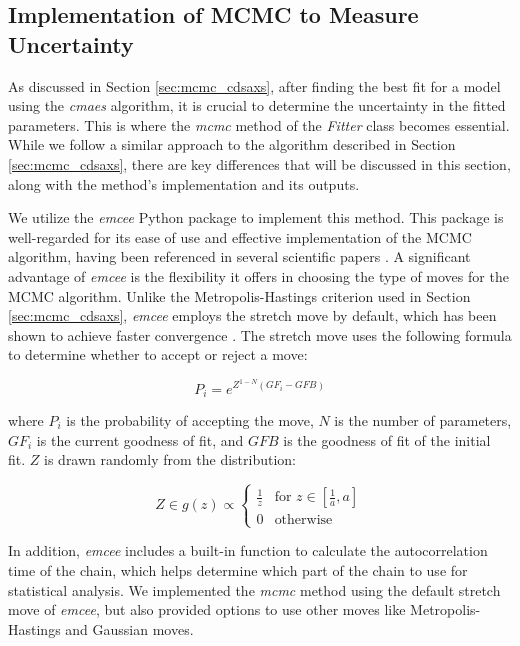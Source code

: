 \subsection{Implementation of MCMC to Measure Uncertainty}

As discussed in Section \ref{sec:mcmc_cdsaxs}, after finding the best fit for a model using the \textit{cmaes} algorithm, it is crucial 
to determine the uncertainty in the fitted parameters. This is where the \textit{mcmc} method of the \textit{Fitter} class becomes essential. 
While we follow a similar approach to the algorithm described in Section \ref{sec:mcmc_cdsaxs}, there are key differences that will be discussed 
in this section, along with the method's implementation and its outputs.

\medskip

We utilize the \textit{emcee} Python package \cite{emcee} to implement this method. This package is well-regarded for its ease 
of use and effective implementation of the MCMC algorithm, having been referenced in several scientific papers \cite{emcee_refed}. 
A significant advantage of \textit{emcee} is the flexibility it offers in choosing the type of moves for the MCMC algorithm. Unlike 
the Metropolis-Hastings criterion used in Section \ref{sec:mcmc_cdsaxs}, \textit{emcee} employs the stretch move by default, which 
has been shown to achieve faster convergence \cite{goodman2010_strech_move,emcee}. The stretch move uses the following formula to 
determine whether to accept or reject a move:

\begin{equation}
    P_{i} = e^{Z^{1-N} (GF_{i} -GFB)}
\end{equation}

where \(P_{i}\) is the probability of accepting the move, \(N\) is the number of parameters, \(GF_{i}\) is the current goodness of fit, 
and \(GFB\) is the goodness of fit of the initial fit. \(Z\) is drawn randomly from the distribution:

\begin{equation}
    Z \in g(z) \propto 
    \begin{cases} 
      \frac{1}{z} & \text{for } z \in \left[\frac{1}{a}, a\right] \\
      0 & \text{otherwise}
    \end{cases}
\end{equation}

\medskip

In addition, \textit{emcee} includes a built-in function to calculate the autocorrelation time of the chain, which helps determine which part of the chain to use for statistical analysis. We implemented the \textit{mcmc} method using the default stretch move of \textit{emcee}, but also provided options to use other moves like Metropolis-Hastings and Gaussian moves.

